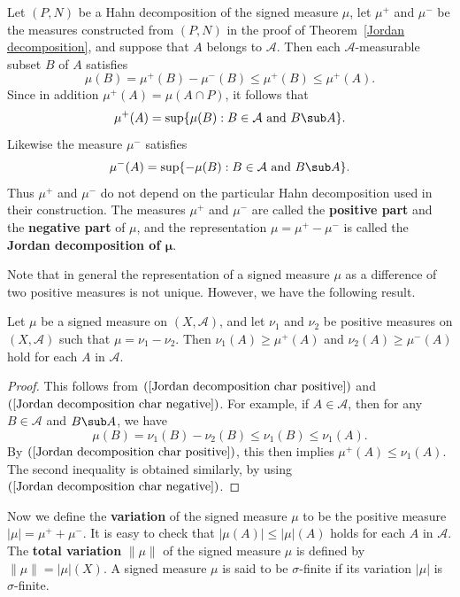 Let $(P,N)$ be a Hahn decomposition of the signed measure $\mu$, let $\mu^+$ and $\mu^-$ be the measures constructed from $(P,N)$ in the proof of Theorem~\ref{Jordan decomposition}, and suppose that $A$ belongs to $\mathcal{A}$. Then each $\mathcal{A}$-measurable subset $B$ of $A$ satisfies
\[\mu(B)=\mu^+(B)-\mu^-(B)\leq\mu^+(B)\leq\mu^+(A).\]
Since in addition $\mu^+(A)=\mu(A\cap P)$, it follows that
\begin{align}\label{Jordan decomposition char positive}
\mu^+(A)=\sup\{\mu(B):B\in\mathcal{A}\text{ and }B\sub A\}.
\end{align}
Likewise the measure $\mu^-$ satisfies
\begin{align}\label{Jordan decomposition char negative}
\mu^-(A)=\sup\{-\mu(B):B\in\mathcal{A}\text{ and }B\sub A\}.
\end{align}
Thus $\mu^+$ and $\mu^-$ do not depend on the particular Hahn decomposition used in their construction. The measures $\mu^+$ and $\mu^-$ are called the \textbf{positive part} and the \textbf{negative part} of $\mu$, and the representation $\mu=\mu^+-\mu^-$ is called the \textbf{Jordan decomposition of $\bm{\mu}$}.\par
Note that in general the representation of a signed measure $\mu$ as a difference of two positive measures is not unique. However, we have the following result.
\begin{proposition}
Let $\mu$ be a signed measure on $(X,\mathcal{A})$, and let $\nu_1$ and $\nu_2$ be positive measures on $(X,\mathcal{A})$ such that $\mu=\nu_1-\nu_2$. Then $\nu_1(A)\geq\mu^+(A)$ and $\nu_2(A)\geq\mu^-(A)$ hold for each $A$ in $\mathcal{A}$.
\end{proposition}
\begin{proof}
This follows from $(\ref{Jordan decomposition char positive})$ and $(\ref{Jordan decomposition char negative})$. For example, if $A\in\mathcal{A}$, then for any $B\in\mathcal{A}$ and $B\sub A$, we have
\[\mu(B)=\nu_1(B)-\nu_2(B)\leq\nu_1(B)\leq\nu_1(A).\]
By $(\ref{Jordan decomposition char positive})$, this then implies $\mu^+(A)\leq\nu_1(A)$. The second inequality is obtained similarly, by using $(\ref{Jordan decomposition char negative})$.
\end{proof}
Now we define the \textbf{variation} of the signed measure $\mu$ to be the positive measure $|\mu|=\mu^++\mu^-$. It is easy to check that $|\mu(A)|\leq|\mu|(A)$ holds for each $A$ in $\mathcal{A}$. The \textbf{total variation} $\|\mu\|$ of the signed measure $\mu$ is defined by $\|\mu\|=|\mu|(X)$. A signed measure $\mu$ is said to be $\sigma$-finite if its variation $|\mu|$ is $\sigma$-finite. 
